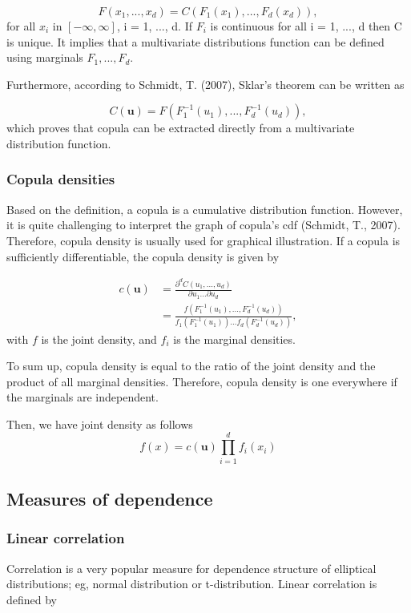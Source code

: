 \documentclass[12pt,a4paper]{article}
\numberwithin{equation}{section}
\begin{document}
 \[F(x_1, ..., x_d) = C(F_1(x_1), ..., F_d(x_d)),\]
for all $x_i$ in $[-\infty, \infty]$, i = 1, ..., d. If $F_i$ is continuous for all i = 1, ..., d then C is unique. It implies that a multivariate distributions function can be defined using marginals $F_1, ..., F_d$.

Furthermore, according to Schmidt, T. (2007), Sklar's theorem can be written as

\[C(\textbf{u}) = F(F_1^{-1}(u_1), ..., F_d^{-1}(u_d)),\]
which proves that copula can be extracted directly from a multivariate distribution function. 

\subsubsection{Copula densities}

Based on the definition, a copula is a cumulative distribution function. However, it is quite challenging to interpret the graph of copula's cdf (Schmidt, T., 2007). Therefore, copula density is usually used for graphical illustration. If a copula is sufficiently differentiable, the copula density is given by

\begin{equation*}
\begin{split}
c(\textbf{u}) &= \frac{\partial^d C(u_1, ..., u_d)}{\partial u_1... \partial u_d}\\
		     & = \frac{f(F_1^{-1}(u_1), ..., F_d^{-1}(u_d))}{f_1(F_1^{-1}(u_1))...f_d(F_d^{-1}(u_d))},
\end{split}
\end{equation*}
with $f$ is the joint density, and $f_i$ is the marginal densities.

To sum up, copula density is equal to the ratio of the joint density and the product of all marginal densities. Therefore, copula density is one everywhere if the marginals are independent.

Then, we have joint density as follows
\[f(x) = c(\textbf{u}) \prod_{i=1}^{d} f_i(x_i)\]
 
 \subsection{Measures of dependence}
 
 \subsubsection{Linear correlation}
 Correlation is a very popular measure for dependence structure of elliptical distributions; eg, normal distribution or t-distribution. Linear correlation is defined by
 
\end{document}
